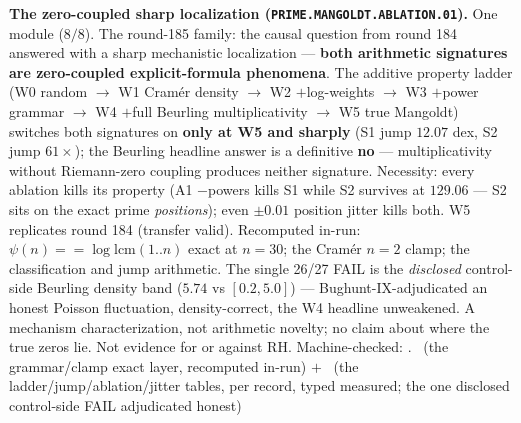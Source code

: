 \documentclass[11pt,a4paper]{article}
\theoremstyle{definition}
\begin{document}
\par\smallskip\noindent\textbf{The zero-coupled sharp localization
(\texttt{PRIME.\allowbreak MANGOLDT.\allowbreak ABLATION.01}).}
One module ($8/8$).  The round-185 family: the causal question
from round 184 answered with a sharp mechanistic localization ---
\textbf{both arithmetic signatures are zero-coupled
explicit-formula phenomena}.  The additive property ladder (W0
random $\to$ W1 Cram\'er density $\to$ W2 $+$log-weights $\to$ W3
$+$power grammar $\to$ W4 $+$full Beurling multiplicativity $\to$
W5 true Mangoldt) switches both signatures on \textbf{only at W5
and sharply} (S1 jump $12.07$ dex, S2 jump $61\times$); the
Beurling headline answer is a definitive \textbf{no} ---
multiplicativity without Riemann-zero coupling produces neither
signature.  Necessity: every ablation kills its property (A1
$-$powers kills S1 while S2 survives at $129.06$ --- S2 sits on
the exact prime \emph{positions}); even $\pm 0.01$ position
jitter kills both.  W5 replicates round 184 (transfer valid).
Recomputed in-run: $\psi(n) == \log\mathrm{lcm}(1..n)$ exact at
$n = 30$; the Cram\'er $n = 2$ clamp; the classification and jump
arithmetic.  The single 26/27 FAIL is the \emph{disclosed}
control-side Beurling density band ($5.74$ vs $[0.2, 5.0]$) ---
Bughunt-IX-adjudicated an honest Poisson fluctuation,
density-correct, the W4 headline unweakened.  A mechanism
characterization, not arithmetic novelty; no claim about where
the true zeros lie.  Not evidence for or against RH.
Machine-checked: .
\mE\ (the grammar/clamp exact layer, recomputed in-run) $+$ \mC\
(the ladder/jump/ablation/jitter tables, per record, typed
measured; the one disclosed control-side FAIL adjudicated honest)
\par\smallskip
\end{document}
